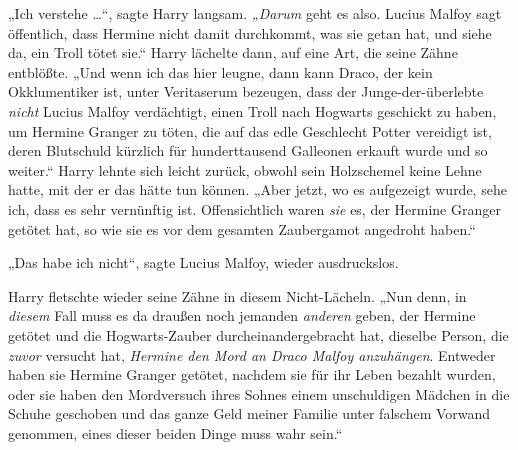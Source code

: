 „Ich verstehe …“, sagte Harry langsam. \emph{„Darum} geht es also. Lucius Malfoy sagt öffentlich, dass Hermine nicht damit durchkommt, was sie getan hat, und siehe da, ein Troll tötet sie.“ Harry lächelte dann, auf eine Art, die seine Zähne entblößte.
„Und wenn ich das hier leugne, dann kann Draco, der kein Okklumentiker ist, unter Veritaserum bezeugen, dass der Junge-der-überlebte \emph{nicht} Lucius Malfoy verdächtigt, einen Troll nach Hogwarts geschickt zu haben, um Hermine Granger zu töten, die auf das edle Geschlecht Potter vereidigt ist, deren Blutschuld kürzlich für hunderttausend Galleonen erkauft wurde und so weiter.“
Harry lehnte sich leicht zurück, obwohl sein Holzschemel keine Lehne hatte, mit der er das hätte tun können.
„Aber jetzt, wo es aufgezeigt wurde, sehe ich, dass es sehr vernünftig ist. Offensichtlich waren \emph{sie} es, der Hermine Granger getötet hat, so wie sie es vor dem gesamten Zaubergamot angedroht haben.“

„Das habe ich nicht“, sagte Lucius Malfoy, wieder ausdruckslos.

Harry fletschte wieder seine Zähne in diesem Nicht-Lächeln.
„Nun denn, in \emph{diesem} Fall muss es da draußen noch jemanden \emph{anderen} geben, der Hermine getötet und die Hogwarts-Zauber durcheinandergebracht hat, dieselbe Person, die \emph{zuvor} versucht hat, \emph{Hermine den Mord an Draco Malfoy anzuhängen}. Entweder haben sie Hermine Granger getötet, nachdem sie für ihr Leben bezahlt wurden, oder sie haben den Mordversuch ihres Sohnes einem unschuldigen Mädchen in die Schuhe geschoben und das ganze Geld meiner Familie unter falschem Vorwand genommen, eines dieser beiden Dinge muss wahr sein.“

